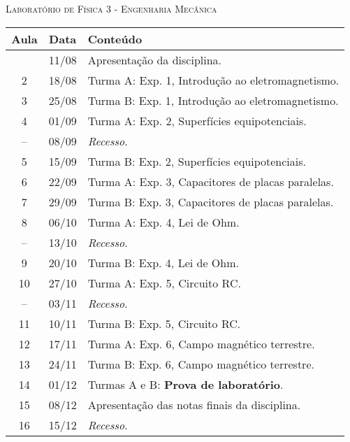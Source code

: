 \vspace{1cm}
\begin{center}
\Large\textsc{Laboratório de Física 3 - Engenharia Mecânica}
\end{center}

\begin{center}
\begin{longtable}{ccp{70mm}}
\toprule
Aula & Data & Conteúdo \\
\midrule
\endhead
\bottomrule
\endfoot
1 & 11/08 & Apresentação da disciplina. \\
2 & 18/08 & Turma A: Exp. 1, Introdução ao eletromagnetismo. \\
3 & 25/08 & Turma B: Exp. 1, Introdução ao eletromagnetismo. \\
4 & 01/09 & Turma A: Exp. 2, Superfícies equipotenciais. \\
-- & 08/09 & \emph{Recesso}. \\
5 & 15/09 & Turma B: Exp. 2, Superfícies equipotenciais. \\
6 & 22/09 & Turma A: Exp. 3, Capacitores de placas paralelas. \\
7 & 29/09 & Turma B: Exp. 3, Capacitores de placas paralelas. \\
8 & 06/10 & Turma A: Exp. 4, Lei de Ohm. \\
-- & 13/10 & \emph{Recesso}. \\
9 & 20/10 & Turma B: Exp. 4, Lei de Ohm. \\
10 & 27/10 & Turma A: Exp. 5, Circuito RC. \\
-- & 03/11 & \emph{Recesso}. \\
11 & 10/11 & Turma B: Exp. 5, Circuito RC. \\
12 & 17/11 & Turma A: Exp. 6, Campo magnético terrestre. \\
13 & 24/11 & Turma B: Exp. 6, Campo magnético terrestre. \\
14 & 01/12 & Turmas A e B: \textbf{Prova de laboratório}. \\
15 & 08/12 & Apresentação das notas finais da disciplina. \\
16 & 15/12 & \emph{Recesso}. \\
\end{longtable}
\end{center}

\cleardoublepage
